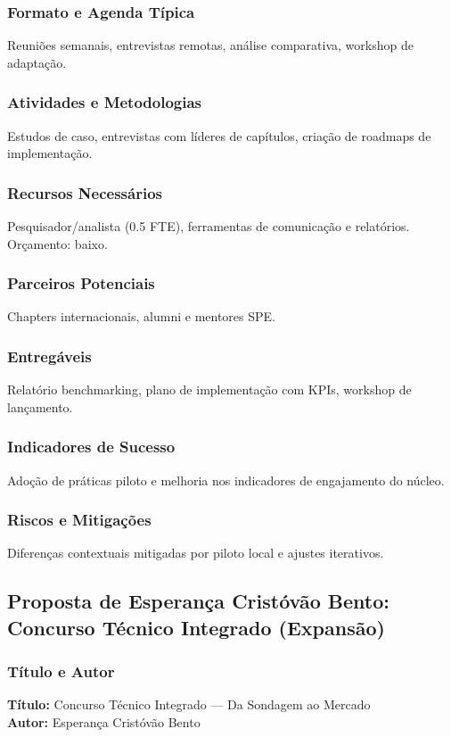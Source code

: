\documentclass[12pt,a4paper]{article}
\begin{document}
\subsubsection*{Formato e Agenda Típica}
Reuniões semanais, entrevistas remotas, análise comparativa, workshop de adaptação.

\subsubsection*{Atividades e Metodologias}
Estudos de caso, entrevistas com líderes de capítulos, criação de roadmaps de implementação.

\subsubsection*{Recursos Necessários}
Pesquisador/analista (0.5 FTE), ferramentas de comunicação e relatórios. Orçamento: baixo.

\subsubsection*{Parceiros Potenciais}
Chapters internacionais, alumni e mentores SPE.

\subsubsection*{Entregáveis}
Relatório benchmarking, plano de implementação com KPIs, workshop de lançamento.

\subsubsection*{Indicadores de Sucesso}
Adoção de práticas piloto e melhoria nos indicadores de engajamento do núcleo.

\subsubsection*{Riscos e Mitigações}
Diferenças contextuais mitigadas por piloto local e ajustes iterativos.

\subsection{Proposta de Esperança Cristóvão Bento: Concurso Técnico Integrado (Expansão)}

\subsubsection*{Título e Autor}
\textbf{Título:} Concurso Técnico Integrado — Da Sondagem ao Mercado \\
\textbf{Autor:} Esperança Cristóvão Bento
\end{document}
